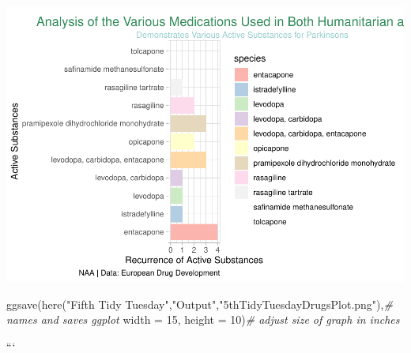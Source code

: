\documentclass[
]{article}
\newenvironment{Shaded}{\begin{snugshade}}{\end{snugshade}}
\newcommand{\AttributeTok}[1]{\textcolor[rgb]{0.77,0.63,0.00}{#1}}
\newcommand{\CommentTok}[1]{\textcolor[rgb]{0.56,0.35,0.01}{\textit{#1}}}
\newcommand{\DecValTok}[1]{\textcolor[rgb]{0.00,0.00,0.81}{#1}}
\newcommand{\FunctionTok}[1]{\textcolor[rgb]{0.00,0.00,0.00}{#1}}
\newcommand{\NormalTok}[1]{#1}
\newcommand{\StringTok}[1]{\textcolor[rgb]{0.31,0.60,0.02}{#1}}
\begin{document}
\includegraphics{../Outputs/unnamed-chunk-3-1.pdf}

\begin{Shaded}
\begin{Highlighting}[]
\FunctionTok{ggsave}\NormalTok{(}\FunctionTok{here}\NormalTok{(}\StringTok{"Fifth Tidy Tuesday"}\NormalTok{,}\StringTok{"Output"}\NormalTok{,}\StringTok{"5thTidyTuesdayDrugsPlot.png"}\NormalTok{),}\CommentTok{\# names and saves ggplot}
       \AttributeTok{width =} \DecValTok{15}\NormalTok{, }\AttributeTok{height =} \DecValTok{10}\NormalTok{)}\CommentTok{\# adjust size of graph in inches}
\end{Highlighting}
\end{Shaded}

```
\end{document}
